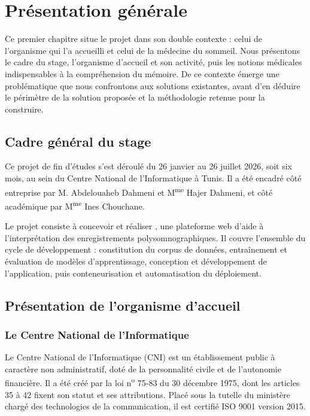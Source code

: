 \chapter{Présentation générale}
\label{chap:presentation}


Ce premier chapitre situe le projet dans son double contexte : celui de l'organisme
qui l'a accueilli et celui de la médecine du sommeil. Nous présentons le cadre du
stage, l'organisme d'accueil et son activité, puis les notions médicales
indispensables à la compréhension du mémoire. De ce contexte émerge une problématique
que nous confrontons aux solutions existantes, avant d'en déduire le périmètre de la
solution proposée et la méthodologie retenue pour la construire.

\section{Cadre général du stage}

Ce projet de fin d'études s'est déroulé du 26 janvier au 26 juillet 2026,
soit six mois, au sein du Centre National de l'Informatique à Tunis. Il a été
encadré côté entreprise par M. Abdelouaheb Dahmeni et M\textsuperscript{me} Hajer
Dahmeni, et côté académique par M\textsuperscript{me} Ines Chouchane.

Le projet consiste à concevoir et réaliser \hypnoria{}, une plateforme web d'aide à
l'interprétation des enregistrements polysomnographiques. Il couvre l'ensemble du
cycle de développement : constitution du corpus de données, entraînement et évaluation
de modèles d'apprentissage, conception et développement de l'application, puis
conteneurisation et automatisation du déploiement.

\section{Présentation de l'organisme d'accueil}

\subsection{Le Centre National de l'Informatique}

Le Centre National de l'Informatique (CNI) est un établissement public à caractère non
administratif, doté de la personnalité civile et de l'autonomie financière. Il a été
créé par la loi n\textsuperscript{o} 75-83 du 30 décembre 1975, dont les articles 35 à
42 fixent son statut et ses attributions. Placé sous la tutelle du ministère chargé des
technologies de la communication, il est certifié ISO 9001 version 2015.

